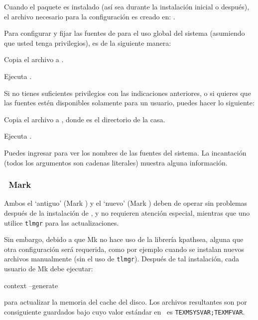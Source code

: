 \documentclass{article}
\begin{document}
Cuando el paquete  es instalado (así sea
durante la instalación inicial o después), el archivo
necesario para la configuración es creado en:
. 

Para configurar y fijar las fuentes de \TL{} para el uso
global del sistema (asumiendo que usted tenga privilegios),
es de la siguiente manera: 
\begin{enumerate*} 
	\item Copia el archivo  a
.  \item Ejecuta
.  
\end{enumerate*}

Si no tienes suficientes privilegios con las indicaciones anteriores, o
si quieres que las fuentes estén disponibles solamente para un
usuario, puedes hacer lo siguiente:
\begin{enumerate*}
	\item Copia el archivo  a , donde \filename{~} es el directorio de la casa. 
	\item Ejecuta . 
\end{enumerate*}

Puedes ingresar  para ver los nombres de las fuentes del
sistema. La incantación 
(todos los argumentos son cadenas literales) muestra alguna
información.

\subsubsection{\ConTeXt\ Mark }
\label{sec:context-mkiv}

Ambos el `antiguo' \ConTeXt{} (Mark ) y el `nuevo' \ConTeXt{}
(Mark ) deben de operar sin problemas después de la
instalación de \TL{}, y no requieren atención especial, mientras que
uno utilice \verb+tlmgr+ para las actualizaciones. 

Sin embargo, debido a que \ConTeXt{} Mk no hace uso
de la librería kpathsea, alguna que otra configuración será
requerida, como por ejemplo cuando se instalan nuevos
archivos manualmente (sin el uso de
\verb+tlmgr+). Después de tal instalación, cada usuario de Mk
debe ejecutar:
\begin{sverbatim}
context --generate
\end{sverbatim}
para actualizar la memoria del cache del disco.  Los
archivos resultantes son por consiguiente guardados bajo
 cuyo valor estándar en \TL\ es
\verb+TEXMSYSVAR;TEXMFVAR+.
\end{document}

